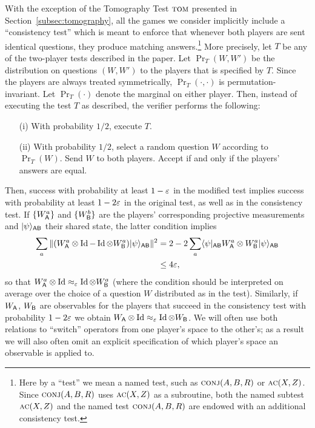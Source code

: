 With the exception of the Tomography Test $\textsc{tom}$ presented in Section~\ref{subsec:tomography}, 
all the games we consider implicitly include a ``consistency test'' which is meant to enforce that whenever both players are sent identical questions, they produce matching answers.\footnote{Here by a ``test'' we mean a named test, such as $\textsc{conj}(A,B,R)$ or $\textsc{ac}(X,Z)$. Since $\textsc{conj}(A,B,R)$ uses $\textsc{ac}(X,Z)$ as a subroutine, both the named subtest $\textsc{ac}(X,Z)$ and the named test $\textsc{conj}(A,B,R)$ are endowed with an additional consistency test.} More precisely, let $T$ be any of the two-player tests described in the paper. Let $\Pr_T(W,W')$ be the distribution on questions $(W,W')$ to the players that is specified by $T$. Since the players are always treated symmetrically, $\Pr_T(\cdot,\cdot)$ is permutation-invariant. Let $\Pr_T(\cdot)$ denote the marginal on either player. Then, instead of executing the test $T$ as described, the verifier performs the following: 
\begin{enumerate}
\item[(i)] With probability $1/2$, execute $T$.
\item[(ii)] With probability $1/2$, select a random question $W$ according to $\Pr_T(W)$. Send $W$ to both players. Accept if and only if the players' answers are equal. 
\end{enumerate}
Then, success with probability at least $1-\varepsilon$ in the modified test implies success with probability at least $1-2\varepsilon$ in the original test, as well as in the consistency test. If $\{W_{{\textsf{A}}}^a\}$ and $\{W_{{\textsf{B}}}^b\}$ are the players' corresponding projective measurements and $|\psi\rangle_{{\textsf{AB}}}$ their shared state, the latter condition implies 
\begin{align}
\sum_a \|(W_{{\textsf{A}}}^a \otimes \mathop{\rm Id}\nolimits - \mathop{\rm Id}\nolimits \otimes W_{{\textsf{B}}}^a)|\psi\rangle_{{\textsf{AB}}}\|^2 &= 2-2 \sum_a \langle\psi|_{{\textsf{AB}}} W_{{\textsf{A}}}^a \otimes W_{{\textsf{B}}}^a |\psi\rangle_{{\textsf{AB}}} \notag\\ 
&\leq 4 \varepsilon,\label{eq:consistency}
\end{align}
so that $W_{{\textsf{A}}}^a \otimes \mathop{\rm Id}\nolimits \approx_{\varepsilon} \mathop{\rm Id}\nolimits \otimes
W_{{\textsf{B}}}^a$ (where the condition should be interpreted on average over the
choice of a question $W$ distributed as in the test). Similarly, if
$W_{{\textsf{A}}}$, $W_{{\textsf{B}}}$ are observables for the players that succeed in the
consistency test with probability $1-2\varepsilon$ we obtain $W_{{\textsf{A}}}\otimes \mathop{\rm Id}\nolimits
\approx_{\varepsilon} \mathop{\rm Id}\nolimits \otimes W_{{\textsf{B}}}$. We will often use both relations to ``switch'' operators from one player's space to the other's; as a result we will also often omit an explicit specification of which player's space an observable is applied to. 


